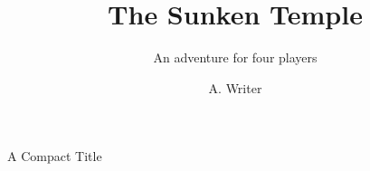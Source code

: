\begin{ExampleBlock}{A Compact Title}
\title{The Sunken Temple}
\subtitle{An adventure for four players}
\author{A. Writer}
\RpgMakeTitle


\end{ExampleBlock}
